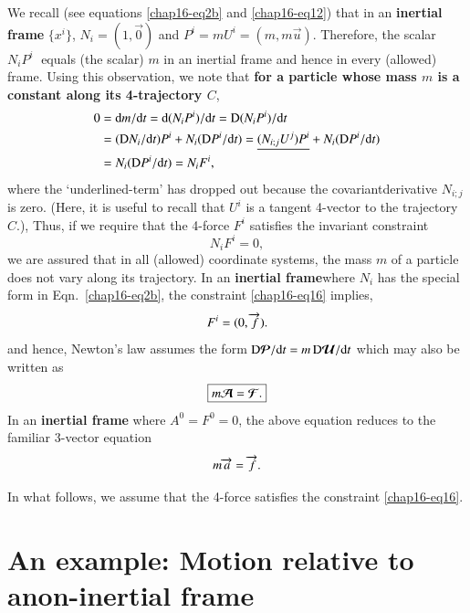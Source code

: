 We recall (see equations \eqref{chap16-eq2b} and \eqref{chap16-eq12})  that in  an \textbf{inertial frame} $\{x^i\}$, $N_i=(1,\vec{0})$ and $P^i=mU^i= (m,m\vec{u})$. Therefore,  the scalar $N_iP^i\;$ equals (the scalar) $m$ in  an inertial frame and hence in every (allowed) frame. Using this observation, we note that  \textbf{for a particle whose mass $m$ is a constant along its 4-trajectory $C$},
\begin{align*}
0 &= \mathrm{d} m/\mathrm{d} t = \mathrm{d} (N_i P^i )/\mathrm{d} t =
{\mathrm{D}}(N_i P^i )/\mathrm{d} t  \notag \\  
&=({\mathrm{D}}N_i/\mathrm{d} t)P^i + N_i ({\mathrm{D}}P^i/\mathrm{d} t) 
= 
\underline{(N_{i;j}U^j)P^i 
} +N_i({\mathrm{D}}P^i/\mathrm{d} t) \notag \\  
&= N_i({\mathrm{D}}P^i/\mathrm{d} t) = N_i F^i,
\end{align*}
where the `underlined-term' has dropped  out because the covariant\break derivative $N_{i;j}$ is zero. (Here, it is useful to recall that $U^i$ is a tangent 4-vector to the trajectory $C$.), Thus, if we require that the  4-force  $F^i $ satisfies the  invariant constraint
\begin{equation}
N_i F^i =0,\label{chap16-eq16}
\end{equation}
we are assured that in all (allowed) coordinate systems, the mass $m$ of a particle does not vary along its trajectory. In an \textbf{inertial frame}where $N_i$ has the special form in Eqn.~\eqref{chap16-eq2b}, the constraint \eqref{chap16-eq16} implies, 
\begin{equation}
F^i =(0, \overrightarrow{f}).\label{chap16-eq17}
\end{equation}
and hence, Newton's law assumes the form ${{\mathrm{D}}}\bm{\mathcal{P}}/\mathrm{d} t=m\,{{\mathrm{D}}}\bm{\mathcal{U}}/\mathrm{d} t $  which may also be written as
\begin{equation}
\boxed{m\bm{\mathcal{A}}  =\bm{\mathcal{F}}.}\label{chap16-eq18}
\end{equation}
In an \textbf{inertial frame} where $ A^0 =F^0=0$, the above equation reduces to the familiar 3-vector equation
\begin{equation}
m\overrightarrow{a}  =\overrightarrow{f}.\label{chap16-eq19}
\end{equation}

In what follows, we assume that the 4-force satisfies the constraint \eqref{chap16-eq16}.

\section{An example: Motion relative to a\hfil\break non-inertial frame}\label{chap16-sec6}

